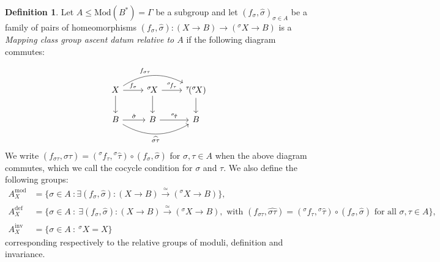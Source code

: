 \documentclass[10pt]{amsart}
\theoremstyle{definition}
\newtheorem{definition}[theorem]{Definition}
\begin{document}
\begin{definition}
Let $A \leq \mathrm{Mod}(B^*) = \mathfrak{\Gamma}$ be a subgroup and let $(f_\sigma , \hat{\sigma})_{\sigma \in A}$ be a family of pairs of homeomorphisms $(f_\sigma, \hat{\sigma}) \colon (X \to B) \to ( {^\sigma \! X} \to B)$ is a {\em Mapping class group ascent datum relative to $A$} if the following diagram commutes: 

\begin{equation*}
    \begin{tikzcd}
        X \arrow[rr, bend left = 30, "f_{\sigma \tau}"] \arrow[r, "f_{\sigma}"] \arrow[d] & {^\sigma \! X} \arrow[r, "{^\sigma \! f_{\tau}}"] \arrow[d] & {^\tau \! ({^\sigma \! X})} \arrow[d] \\
        B \arrow[rr, bend right = 30, "\widehat{\sigma \tau}"']\arrow[r, "\hat{\sigma}"] & B \arrow[r, "{^\sigma \! \hat{\tau}}"] & B
    \end{tikzcd}
\end{equation*}
We write $(f_{\sigma \tau} , \widehat{\sigma \tau}) = ({^\sigma f_\tau} , {^\sigma \hat{\tau}}) \circ (f_\sigma , \hat{\sigma}) $ for $\sigma, \tau \in A$ when the above diagram commutes, which we call the cocycle condition for $\sigma$ and $\tau$. 
We also define the following groups:
\begin{align*}
    A^{\mathrm{mod}}_X &= \{ \sigma \in A \  \colon \exists (f_{\sigma}, \hat{\sigma}) \colon (X \to B) \xrightarrow[]{\simeq}   ({^\sigma \! X}  \to B) \}, \\
    A_X^{\mathrm{def}} &= \{\sigma \in A \ : \ \exists (f_{\sigma}, \hat{\sigma}) \colon (X \to B) \xrightarrow[]{\simeq}   ({^\sigma \! X}  \to B) , \text{ with } (f_{\sigma \tau} , \widehat{\sigma \tau}) = ({^\sigma f_\tau} , {^\sigma \hat{\tau}}) \circ (f_\sigma , \hat{\sigma}) \text{ for all } \sigma,\tau \in A \}, \\
    A^{\mathrm{inv}}_X &= \{ \sigma \in A  \ : \  {^\sigma \! X}= X \}    
\end{align*} corresponding respectively to the relative groups of moduli, definition and invariance. 
\end{definition}
\end{document}
